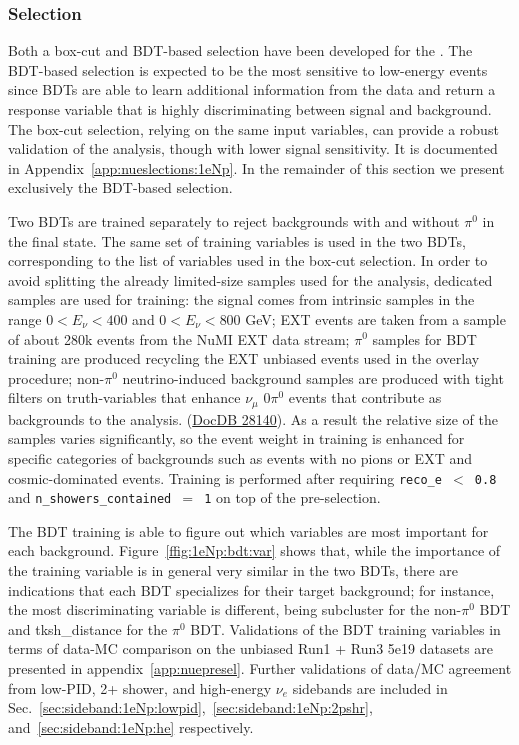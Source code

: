 \subsubsection{\npsel Selection}

Both a box-cut and BDT-based selection have been developed for the \npsel. The BDT-based selection is expected to be the most sensitive to low-energy \nue events since BDTs are able to learn additional information from the data and return a response variable that is highly discriminating between signal and background. The box-cut selection, relying on the same input variables, can provide a robust validation of the analysis, though with lower signal sensitivity. It is documented in Appendix~\ref{app:nueslections:1eNp}. In the remainder of this section we present exclusively the BDT-based selection.

Two BDTs are trained separately to reject backgrounds with and without $\pi^0$ in the final state. The same set of training variables is used in the two BDTs, corresponding to the list of variables used in the box-cut selection. In order to avoid splitting the already limited-size samples used for the analysis, dedicated samples are used for training: the signal comes from intrinsic \nue samples in the range $0<E_\nu<400$ and $0<E_\nu<800$ \si{GeV}; EXT events are taken from a sample of about 280k events from the NuMI EXT data stream; $\pi^0$ samples for BDT training are produced recycling the EXT unbiased events used in the overlay procedure; non-$\pi^0$ neutrino-induced background samples are produced with tight filters on truth-variables that enhance $\nu_{\mu}$ 0$\pi^0$ events that contribute as backgrounds to the analysis. (\href{https://microboone-docdb.fnal.gov/cgi-bin/private/RetrieveFile?docid=28140&filename=tight-nue-back-filter-merge-memo.pdf&version=1}{DocDB 28140}). As a result the relative size of the samples varies significantly, so the event weight in training is enhanced for specific categories of backgrounds such as \numucc events with no pions or EXT and cosmic-dominated events. Training is performed after requiring \texttt{reco\_e $<$ 0.8} and \texttt{n\_showers\_contained $=$ 1} on top of the \npsel pre-selection.  

The BDT training is able to figure out which variables are most important for each background. Figure~\ref{ffig:1eNp:bdt:var} shows that, while the importance of the training variable is in general very similar in the two BDTs, there are indications that each BDT specializes for their target background; for instance, the most discriminating variable is different, being subcluster for the non-$\pi^0$ BDT and tksh\_distance for the $\pi^0$ BDT. %
Validations of the BDT training variables in terms of data-MC comparison on the unbiased Run1 + Run3 5e19 datasets are presented in appendix~\ref{app:nuepresel}. Further validations of data/MC agreement from low-PID, 2+ shower, and high-energy $\nu_e$ sidebands are included in Sec.~\ref{sec:sideband:1eNp:lowpid},~\ref{sec:sideband:1eNp:2pshr}, and~\ref{sec:sideband:1eNp:he} respectively.

